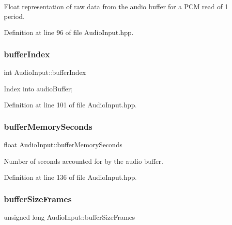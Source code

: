 Float representation of raw data from the audio buffer for a P\+CM read of 1 period. 

Definition at line 96 of file Audio\+Input.\+hpp.

\mbox{\label{classAudioInput_a3c9888a90ca8bc6b42257f3f11ee9a6e}} 
\subsubsection{\texorpdfstring{buffer\+Index}{bufferIndex}}
{\footnotesize\ttfamily int Audio\+Input\+::buffer\+Index\hspace{0.3cm}{\ttfamily [protected]}}

Index into audio\+Buffer; 

Definition at line 101 of file Audio\+Input.\+hpp.

\mbox{\label{classAudioInput_aea3145ccca0f7cebf36a78278ca44031}} 
\subsubsection{\texorpdfstring{buffer\+Memory\+Seconds}{bufferMemorySeconds}}
{\footnotesize\ttfamily float Audio\+Input\+::buffer\+Memory\+Seconds\hspace{0.3cm}{\ttfamily [protected]}}

Number of seconds accounted for by the audio buffer. 

Definition at line 136 of file Audio\+Input.\+hpp.

\mbox{\label{classAudioInput_adb734d274b7ce2967b74e2280ff6d487}} 
\subsubsection{\texorpdfstring{buffer\+Size\+Frames}{bufferSizeFrames}}
{\footnotesize\ttfamily unsigned long Audio\+Input\+::buffer\+Size\+Frames\hspace{0.3cm}{\ttfamily [protected]}}

